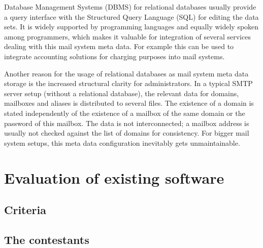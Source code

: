 \documentclass[12pt,a4paper]{scrartcl}
\begin{document}
		Database Management Systems (DBMS) for relational databases usually
		provide a query interface with the Structured Query Language (SQL)
		\cite{sql} for editing the data sets. It is widely supported by
		programming languages and equally widely spoken among programmers, which
		makes it valuable for integration of several services dealing with this
		mail system meta data. For example this can be used to integrate
		accounting solutions for charging purposes into mail systems.


		Another reason for the usage of relational databases as mail system
		meta data storage is the increased structural clarity for
		administrators. In a typical SMTP server setup (without a relational
		database), the relevant data for domains, mailboxes and aliases is
		distributed to several files. The existence of a domain is stated
		independently of the existence of a mailbox of the same domain or the
		password of this mailbox. The data is not interconnected; a mailbox
		address is usually not checked against the list of domains for
		consistency. For bigger mail system setups, this meta data
		configuration inevitably gets unmaintainable.

	\section*{Evaluation of existing software}

		\subsection*{Criteria}

		\subsection*{The contestants}
\end{document}
